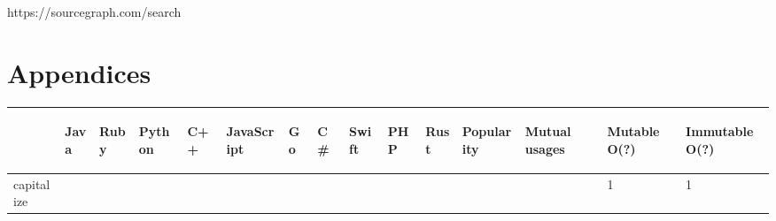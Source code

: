 \documentclass[anonymous,sigplan,review,11pt,nonacm,natbib=false]{acmart}
\begin{document}
    https://sourcegraph.com/search

    \section{Appendices}

    \label{table 1}

    \begin{table}
        \begin{tabular}{lllllllllllllll}
            \hline
            & \begin{sideways}Java\end{sideways}
            & \begin{sideways}Ruby\end{sideways}
            & \begin{sideways}Python\end{sideways}
            & \begin{sideways}C++\end{sideways}
            & \begin{sideways}JavaScript\end{sideways}
            & \begin{sideways}Go\end{sideways}
            & \begin{sideways}C\#\end{sideways}
            & \begin{sideways}Swift\end{sideways}
            & \begin{sideways}PHP\end{sideways}
            & \begin{sideways}Rust\end{sideways}
            & \begin{sideways}Popularity\end{sideways}
            & \begin{sideways}Mutual usages\end{sideways}
            & \begin{sideways}Mutable O(?)\end{sideways}
            & \begin{sideways}Immutable O(?)\end{sideways}
            \\ \hline

            capitalize &  &  &  &  &  &  &  &  &  &  &  &  & 1 & 1 \\


\end{tabular}
\end{table}
\end{document}
